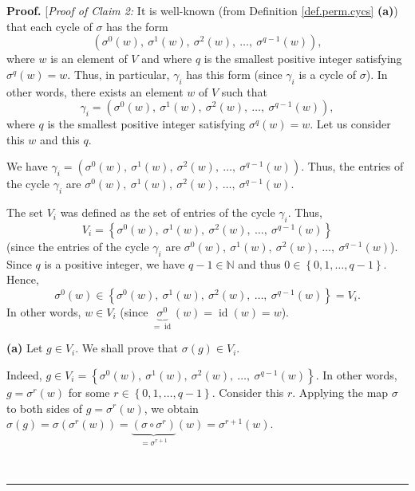 \documentclass[numbers=enddot,12pt,final,onecolumn,notitlepage]{scrartcl}%
\numberwithin{exer}{section}
\theoremstyle{definition}
\newenvironment{proof}[1][Proof]{\noindent\textbf{#1.} }{\ \rule{0.5em}{0.5em}}
\newenvironment{verlong}{}{}
\begin{document}
\begin{verlong}
\begin{proof}
[\textit{Proof of Claim 2:} It is well-known (from Definition
\ref{def.perm.cycs} \textbf{(a)}) that each cycle of $\sigma$ has the form
\[
\left(  \sigma^{0}\left(  w\right)  ,\ \sigma^{1}\left(  w\right)
,\ \sigma^{2}\left(  w\right)  ,\ \ldots,\ \sigma^{q-1}\left(  w\right)
\right)  ,
\]
where $w$ is an element of $V$ and where $q$ is the smallest positive integer
satisfying $\sigma^{q}\left(  w\right)  =w$. Thus, in particular, $\gamma_{i}$
has this form (since $\gamma_{i}$ is a cycle of $\sigma$). In other words,
there exists an element $w$ of $V$ such that%
\[
\gamma_{i}=\left(  \sigma^{0}\left(  w\right)  ,\ \sigma^{1}\left(  w\right)
,\ \sigma^{2}\left(  w\right)  ,\ \ldots,\ \sigma^{q-1}\left(  w\right)
\right)  ,
\]
where $q$ is the smallest positive integer satisfying $\sigma^{q}\left(
w\right)  =w$. Let us consider this $w$ and this $q$.

We have $\gamma_{i}=\left(  \sigma^{0}\left(  w\right)  ,\ \sigma^{1}\left(
w\right)  ,\ \sigma^{2}\left(  w\right)  ,\ \ldots,\ \sigma^{q-1}\left(
w\right)  \right)  $. Thus, the entries of the cycle $\gamma_{i}$ are
$\sigma^{0}\left(  w\right)  ,\ \sigma^{1}\left(  w\right)  ,\ \sigma
^{2}\left(  w\right)  ,\ \ldots,\ \sigma^{q-1}\left(  w\right)  $.

The set $V_{i}$ was defined as the set of entries of the cycle $\gamma_{i}$.
Thus,%
\[
V_{i}=\left\{  \sigma^{0}\left(  w\right)  ,\ \sigma^{1}\left(  w\right)
,\ \sigma^{2}\left(  w\right)  ,\ \ldots,\ \sigma^{q-1}\left(  w\right)
\right\}
\]
(since the entries of the cycle $\gamma_{i}$ are $\sigma^{0}\left(  w\right)
,\ \sigma^{1}\left(  w\right)  ,\ \sigma^{2}\left(  w\right)  ,\ \ldots
,\ \sigma^{q-1}\left(  w\right)  $). Since $q$ is a positive integer, we have
$q-1\in\mathbb{N}$ and thus $0\in\left\{  0,1,\ldots,q-1\right\}  $. Hence,%
\[
\sigma^{0}\left(  w\right)  \in\left\{  \sigma^{0}\left(  w\right)
,\ \sigma^{1}\left(  w\right)  ,\ \sigma^{2}\left(  w\right)  ,\ \ldots
,\ \sigma^{q-1}\left(  w\right)  \right\}  =V_{i}.
\]
In other words, $w\in V_{i}$ (since $\underbrace{\sigma^{0}}%
_{=\operatorname*{id}}\left(  w\right)  =\operatorname*{id}\left(  w\right)
=w$).

\textbf{(a)} Let $g\in V_{i}$. We shall prove that $\sigma\left(  g\right)
\in V_{i}$.

Indeed, $g\in V_{i}=\left\{  \sigma^{0}\left(  w\right)  ,\ \sigma^{1}\left(
w\right)  ,\ \sigma^{2}\left(  w\right)  ,\ \ldots,\ \sigma^{q-1}\left(
w\right)  \right\}  $. In other words, $g=\sigma^{r}\left(  w\right)  $ for
some $r\in\left\{  0,1,\ldots,q-1\right\}  $. Consider this $r$. Applying the
map $\sigma$ to both sides of $g=\sigma^{r}\left(  w\right)  $, we obtain
$\sigma\left(  g\right)  =\sigma\left(  \sigma^{r}\left(  w\right)  \right)
=\underbrace{\left(  \sigma\circ\sigma^{r}\right)  }_{=\sigma^{r+1}}\left(
w\right)  =\sigma^{r+1}\left(  w\right)  $.


\end{proof}
\end{verlong}
\end{document}
